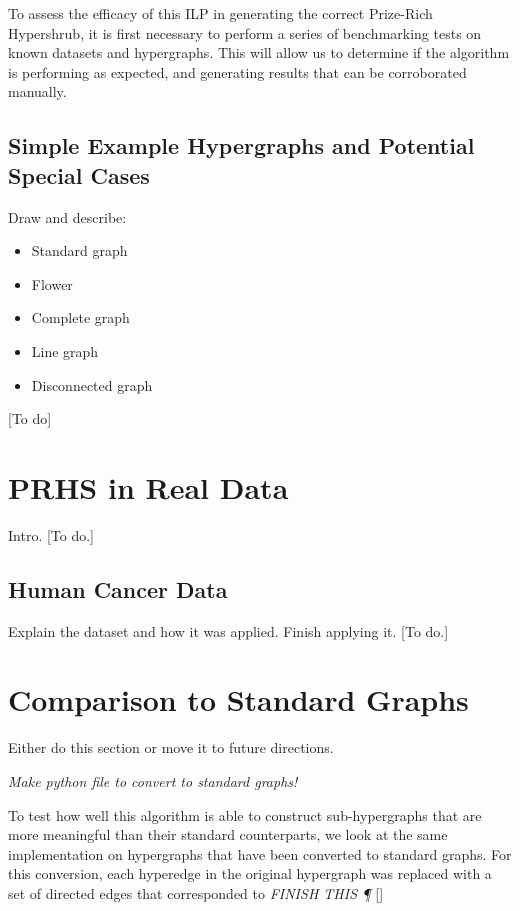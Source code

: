 \documentclass[12pt,twoside]{reedthesis}
\newcommand{\new}[2]{{\color{red}#1 [#2]}}
\theoremstyle{definition}
\begin{document}
  To assess the efficacy of this ILP in generating the correct Prize-Rich Hypershrub, it is first necessary to perform a series of benchmarking tests on known datasets and hypergraphs.  This will allow us to determine if the algorithm is performing as expected, and generating results that can be corroborated manually.\par

  \subsection{Simple Example Hypergraphs and Potential Special Cases}

  \new{
  Draw and describe:
  \begin{itemize}
    \item{Standard graph}
    \item{Flower}
    \item{Complete graph}
    \item{Line graph}
    \item{Disconnected graph}
  \end{itemize}
  }{To do}

  \section{PRHS in Real Data}
  \new{
  Intro.
  }{To do.}

   \subsection{Human Cancer Data}
   \new{
   Explain the dataset and how it was applied. Finish applying it.
   }{To do.}

  \section{Comparison to Standard Graphs}
  \new{

  Either do this section or move it to future directions.

  \emph{Make python file to convert to standard graphs!}

  To test how well this algorithm is able to construct sub-hypergraphs that are more meaningful than their standard counterparts, we look at the same implementation on hypergraphs that have been converted to standard graphs. For this conversion, each hyperedge in the original hypergraph was replaced with a set of directed edges that corresponded to \emph{FINISH THIS \P}}{}
\end{document}
